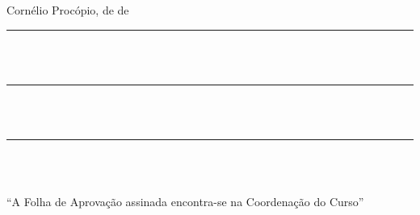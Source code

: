 \vspace{10pt}
\begin{center}
	Cornélio Procópio, {\imprimirdia} de {\imprimirmes} de \imprimirdata
\end{center}
\vspace{30pt}
\begin{center}
	\rule[0pt]{320pt}{0.5pt}\\
	\imprimirbancaO\\ \vspace{50pt}
	
	\rule[0pt]{320pt}{0.5pt}\\
	\imprimirbancaA\\ \vspace{50pt}
	
	\rule[0pt]{320pt}{0.5pt}\\
	\imprimirbancaB\\
\end{center}
\vfill
\begin{center}
	\begin{SingleSpacing}
		“A Folha de Aprovação assinada encontra-se na Coordenação do Curso”
	\end{SingleSpacing}
\end{center}

